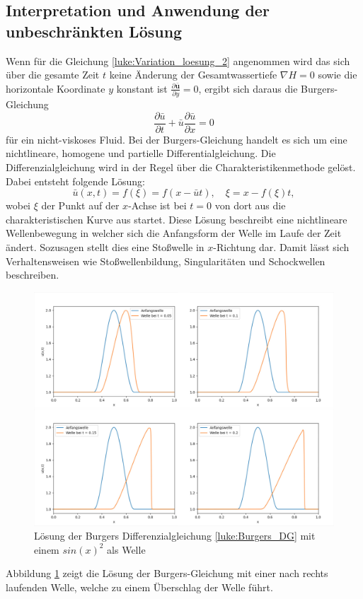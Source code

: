 \subsection{Interpretation und Anwendung der unbeschränkten Lösung}
Wenn für die Gleichung \eqref{luke:Variation_loesung_2} angenommen wird das sich über die gesamte Zeit $t$ keine Änderung der Gesamtwassertiefe $ \nabla H = 0 $ sowie die horizontale Koordinate $y$ konstant ist $\frac{\partial \bar{\bm{u}}}{\partial y} = 0$, ergibt sich daraus die Burgers-Gleichung
\begin{equation}
	\frac{\partial \bar{u}}{\partial t} + \bar{u} \frac{\partial \bar{u}}{\partial x} = 0
	\label{luke:Burgers_DG}
\end{equation}
für ein nicht-viskoses Fluid.
Bei der Burgers-Gleichung handelt es sich um eine nichtlineare, homogene und partielle Differentialgleichung.
Die Differenzialgleichung wird in der Regel über die Charakteristikenmethode gelöst. 
Dabei entsteht folgende Lösung:
\[
\bar{u}(x,t) = f(\xi) = f(x-\bar{u}t),\quad \xi = x-f(\xi)t,
\]
wobei $\xi$ der Punkt auf der $x$-Achse ist bei $t = 0$ von dort aus die charakteristischen Kurve aus startet.
Diese Lösung beschreibt eine nichtlineare Wellenbewegung in welcher sich die Anfangsform der Welle im Laufe der Zeit ändert.
Sozusagen stellt dies eine Stoßwelle in $x$-Richtung dar.
Damit lässt sich Verhaltensweisen wie Stoßwellenbildung, Singularitäten und Schockwellen beschreiben.
\begin{figure}
	\includegraphics[width=\textwidth]{papers/luke/fig/Burger_Loesung_Welle.jpg}
	\caption{Lösung der Burgers Differenzialgleichung \eqref{luke:Burgers_DG} mit einem $sin(x)^2$ als Welle
		\label{luke:fig:Loesung_Burgers}}
\end{figure}
Abbildung \ref{luke:fig:Loesung_Burgers} zeigt die Lösung der Burgers-Gleichung mit einer nach rechts laufenden Welle, welche zu einem Überschlag der Welle führt.

